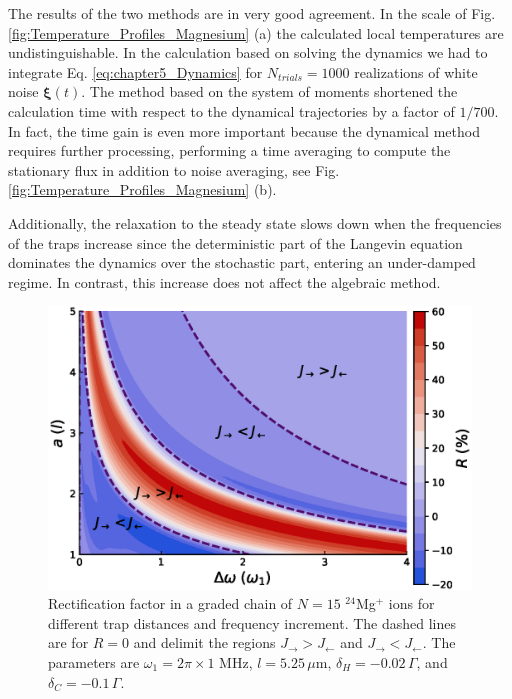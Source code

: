 The results of the two methods are in very good agreement. In the scale of Fig. \ref{fig:Temperature_Profiles_Magnesium} (a)
the calculated local temperatures are undistinguishable. In the calculation based on solving the dynamics we had to integrate Eq. \eqref{eq:chapter5_Dynamics} for $N_{trials} = 1000$ realizations of white noise $\bm{\xi}(t)$. The method based on the system of moments
shortened the calculation time with respect to the dynamical trajectories   by a factor of $1/700$. In fact, the time gain is even more important because
the dynamical method requires further processing, performing a time averaging to compute the stationary flux in addition to noise averaging, see Fig.  \ref{fig:Temperature_Profiles_Magnesium} (b).


Additionally, the relaxation to the steady state slows down when the frequencies of the traps increase since the deterministic part of the Langevin equation dominates the dynamics over the stochastic part, entering an under-damped regime. In contrast, this increase does not affect the
algebraic method.
\begin{figure}
  \center
  \includegraphics[width=0.75\linewidth]{Figures/Graded_24Mg_Rectification_VS_Gradient_and_lattConstant.eps}
  \caption{ Rectification factor in a graded chain of $N=15$ $^{24}$Mg$^+$ ions for different trap distances and frequency increment. The dashed lines are for $R = 0$ and delimit the regions $J_\rightarrow > J_\leftarrow$ and $J_\rightarrow < J_\leftarrow$. The parameters  are $\omega_1 = 2 \pi \times 1$ MHz, $l = 5.25\,\mu$m, $\delta_H = -0.02 \,\Gamma$, and $\delta_C = -0.1 \, \Gamma$.}
  \label{fig:Graded_24Mg_Rectification_VS_Gradient_and_lattConstant}
\end{figure}
%
%
%
%

